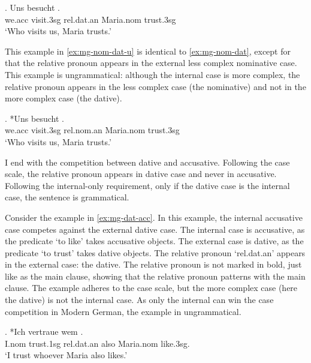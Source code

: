 \exg. Uns besucht   .\\
we.\ac{acc} visit.3\ac{sg}\scsub{[nom]} \ac{rel}.\ac{dat}.\ac{an} Maria.\ac{nom} trust.3\ac{sg}\scsub{[dat]}\\
`Who visits us, Maria trusts.' \label{ex:mg-nom-dat}

This example in \ref{ex:mg-nom-dat-u} is identical to \ref{ex:mg-nom-dat}, except for that the relative pronoun appears in the external less complex nominative case. This example is ungrammatical: although the internal case is more complex, the relative pronoun appears in the less complex case (the nominative) and not in the more complex case (the dative).

\exg. *Uns besucht   .\\
we.\ac{acc} visit.3\ac{sg}\scsub{[nom]} \ac{rel}.\ac{nom}.\ac{an} Maria.\ac{nom} trust.3\ac{sg}\scsub{[dat]}\\
`Who visits us, Maria trusts.' \label{ex:mg-nom-dat-u}

I end with the competition between dative and accusative. Following the case scale, the relative pronoun appears in dative case and never in accusative. Following the internal-only requirement, only if the dative case is the internal case, the sentence is grammatical.

Consider the example in \ref{ex:mg-dat-acc}. In this example, the internal accusative case competes against the external dative case.
The internal case is accusative, as the predicate  `to like' takes accusative objects.
The external case is dative, as the predicate  `to trust' takes dative objects.
The relative pronoun  `\ac{rel}.\ac{dat}.\ac{an}' appears in the external case: the dative. The relative pronoun is not marked in bold, just like as the main clause, showing that the relative pronoun patterns with the main clause.
The example adheres to the case scale, but the more complex case (here the dative) is not the internal case. As only the internal can win the case competition in Modern German, the example in ungrammatical.

\exg. *Ich vertraue wem   . \\
I.\ac{nom} trust.1\ac{sg}\scsub{[dat]} \ac{rel}.\ac{dat}.\ac{an} also Maria.\ac{nom} like.3\ac{sg}\scsub{[acc]}.\\
`I trust whoever Maria also likes.' \label{ex:mg-dat-acc}

